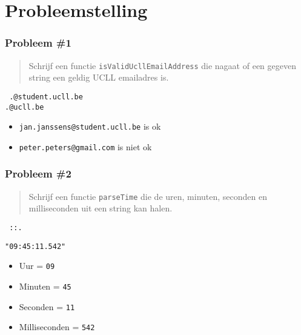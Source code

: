 \section{Probleemstelling}

\frame{\tableofcontents[currentsection]}

\begin{frame}
  \frametitle{Probleem \#1}
  \begin{quote}
    Schrijf een functie \texttt{isValidUcllEmailAddress}
    die nagaat of een gegeven string een geldig UCLL emailadres is.
  \end{quote}
  \vskip2mm
  \begin{center}\tt
    .@student.ucll.be \\
    .@ucll.be \\
  \end{center}
  \vskip2mm
  \begin{itemize}
    \item {\tt jan.janssens@student.ucll.be} is ok
    \item {\tt peter.peters@gmail.com} is niet ok
  \end{itemize}
\end{frame}

\begin{frame}
  \frametitle{Probleem \#2}
  \begin{quote}
    Schrijf een functie \texttt{parseTime} die
    de uren, minuten, seconden en milliseconden uit
    een string kan halen.
  \end{quote}
  \vskip2mm
  \begin{center}\tt
    ::.
  \end{center}
  \vskip2mm
  \begin{center}
    \texttt{"09:45:11.542"}
  \end{center}
  \begin{itemize}
    \item Uur = \texttt{09}
    \item Minuten = \texttt{45}
    \item Seconden = \texttt{11}
    \item Milliseconden = \texttt{542}
  \end{itemize}
\end{frame}

